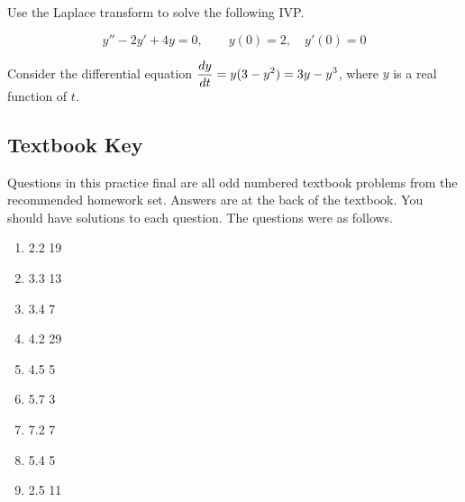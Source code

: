 \documentclass[12pt]{exam}
\begin{document}
\begin{questions}
    \question[10] Use the Laplace transform to solve the following IVP.

    $$\displaystyle y''-2y'+4y=0,\qquad y(0)=2,\quad y'(0)=0$$ %
    
    \question[10] %
    Consider the differential equation $\displaystyle {\frac{dy}{dt}} = y(3-y^2) = 3y - y^3$, where $y$ is a real function of $t$. 
    
\end{questions}

\newpage

\subsection*{Textbook Key}
Questions in this practice final are all odd numbered textbook problems from the recommended homework set. Answers are at the back of the textbook. You should have solutions to each question. The questions were as follows.
\begin{enumerate}
    \item 2.2 19
    \item 3.3 13
    \item 3.4 7
    \item 4.2 29
    \item 4.5 5
    \item 5.7 3
    \item 7.2 7
    \item 5.4 5
    \item 2.5 11
\end{enumerate}
\end{document}
